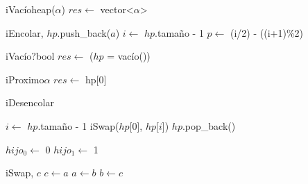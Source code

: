 \begin{Algoritmos}
  \begin{algoritmo}{iVac\'{i}o}{}{heap($\alpha$)}
    $res \gets$ vector<$\alpha$>\;
  \end{algoritmo}

  \begin{algoritmo}{iEncolar}{, }{}
    $hp$.push_back($a$)\;
     $i \gets$ $hp$.tama\~{n}o - 1\;
     $p \gets$ (i/2) - ((i+1)\%2)\;
  \end{algoritmo}

  \begin{algoritmo}{iVac\'{i}o?}{}{bool}
    $res \gets$ ($hp$ = vac\'{i}o())\;
  \end{algoritmo}

  \begin{algoritmo}{iProximo}{}{$\alpha$}
    $res \gets$ hp[0]\;
  \end{algoritmo}

  \begin{algoritmo}{iDesencolar}{}{}

     $i \gets$ $hp$.tama\~{n}o - 1\;
    iSwap($hp$[$0$], $hp$[$i$])\;
    $hp$.pop_back()\;

     $hijo_{0} \gets$ 0\;
     $hijo_{1} \gets$ 1\;

  \end{algoritmo}

  \begin{algoritmo}{iSwap}{, }{}
    \tipo{$\alpha$} $c$\;
    $c \gets a$\;
    $a \gets b$\;
    $b \gets c$\;
  \end{algoritmo}

\end{Algoritmos}
